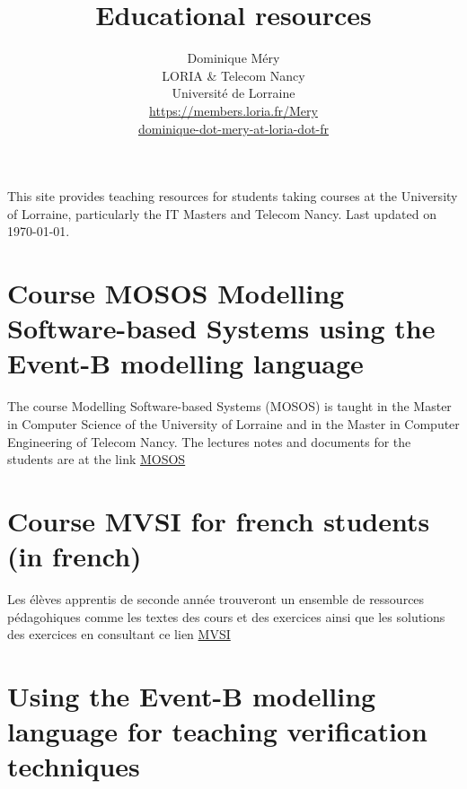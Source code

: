 \documentclass[ 12pt]{article}
\title{Educational resources}
\author{Dominique M\'ery\\
LORIA \& Telecom Nancy\\ Universit\'e de Lorraine\\
\url{https://members.loria.fr/Mery}\\ \url{dominique-dot-mery-at-loria-dot-fr}}
\begin{document}
  \setcounter{ex}{1}
\maketitle

This site provides teaching resources for students taking courses at
the University of Lorraine, particularly the IT Masters and Telecom
Nancy. {Last updated \now on \today}.




\section{ Course MOSOS Modelling Software-based Systems using  the
  Event-B modelling language}
\label{sec:course-mosos-modell}


The   course Modelling Software-based Systems (MOSOS) is taught in
the Master  in Computer Science of the University of Lorraine  and in
the Master in Computer Engineering of Telecom Nancy. The  lectures notes  and documents for the students  are  at the link
\href{https://mery54.github.io/teaching/mosos}{MOSOS}



\section{Course MVSI for french students (in french) }



Les élèves    apprentis de seconde année
trouveront un ensemble de ressources pédagohiques comme les 
textes des cours et des exercices ainsi que les solutions des
exercices en consultant ce lien
\href{https://mery54.github.io/teaching/mvsi}{MVSI}


\section{Using  the Event-B modelling language  for teaching verification 
techniques }
\end{document}
